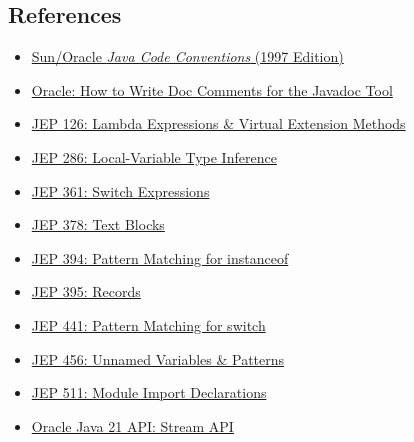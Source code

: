 \documentclass{article}
\begin{document}
\subsection{References}

\begin{itemize}
\item \href{https://www.oracle.com/docs/tech/java/codeconventions.pdf}{Sun/Oracle \emph{Java Code Conventions} (1997 Edition)}
\item \href{https://www.oracle.com/technical-resources/articles/java/javadoc-tool.html}{Oracle: How to Write Doc Comments for the Javadoc Tool}
\item \href{https://openjdk.org/jeps/126}{JEP 126: Lambda Expressions \& Virtual Extension Methods}
\item \href{https://openjdk.org/jeps/286}{JEP 286: Local-Variable Type Inference}
\item \href{https://openjdk.org/jeps/361}{JEP 361: Switch Expressions}
\item \href{https://openjdk.org/jeps/378}{JEP 378: Text Blocks}
\item \href{https://openjdk.org/jeps/394}{JEP 394: Pattern Matching for instanceof}
\item \href{https://openjdk.org/jeps/395}{JEP 395: Records}
\item \href{https://openjdk.org/jeps/441}{JEP 441: Pattern Matching for switch}
\item \href{https://openjdk.org/jeps/456}{JEP 456: Unnamed Variables \& Patterns}
\item \href{https://openjdk.org/jeps/511}{JEP 511: Module Import Declarations}
\item \href{https://docs.oracle.com/en/java/javase/21/docs/api/java.base/java/util/stream/package-summary.html}{Oracle Java 21 API: Stream API}
\end{itemize}
\end{document}
